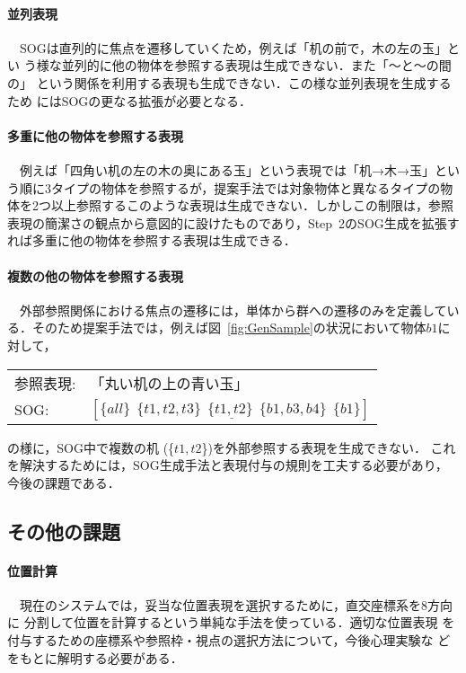 \documentclass[japanese]{jnlp_1.2}
\def\mrel#1{}
\def\mextrel{}
\begin{document}
\paragraph{並列表現}
　SOGは直列的に焦点を遷移していくため，例えば「机の前で，木の左の玉」とい
う様な並列的に他の物体を参照する表現は生成できない．また「〜と〜の間の」
という関係を利用する表現も生成できない．この様な並列表現を生成するため
にはSOGの更なる拡張が必要となる．

\paragraph{多重に他の物体を参照する表現}
　例えば「四角い机の左の木の奥にある玉」という表現では「机→木→玉」とい
う順に3タイプの物体を参照するが，提案手法では対象物体と異なるタイプの物
体を2つ以上参照するこのような表現は生成できない．しかしこの制限は，参照
表現の簡潔さの観点から意図的に設けたものであり，Step~2のSOG生成を拡張す
れば多重に他の物体を参照する表現は生成できる．

\paragraph{複数の他の物体を参照する表現}
　外部参照関係における焦点の遷移には，単体から群への遷移のみを定義してい
る．そのため提案手法では，例えば図~\ref{fig:GenSample}の状況において物体$b1$に対して，
\begin{center}
  \begin{tabular}{ll}
    参照表現:& 「丸い机の上の青い玉」\\
    SOG:&  $[\{all\}\ \mrel{type}\ \{t1,t2,t3\}\ \mrel{shape}\ 
    \underline{\{t1,t2\}\ \mextrel}\ \{b1,b3,b4\}\ \mrel{color}\ \{b1\}]$\\
  \end{tabular}
\end{center}
の様に，SOG中で複数の机 (\{$t1, t2$\})を外部参照する表現を生成できない．
これを解決するためには，SOG生成手法と表現付与の規則を工夫する必要があり，
今後の課題である．


\subsection{その他の課題}

\paragraph{位置計算}
　現在のシステムでは，妥当な位置表現を選択するために，直交座標系を8方向に
分割して位置を計算するという単純な手法を使っている．適切な位置表現
を付与するための座標系や参照枠・視点の選択方法について，今後心理実験な
どをもとに解明する必要がある．
\end{document}
